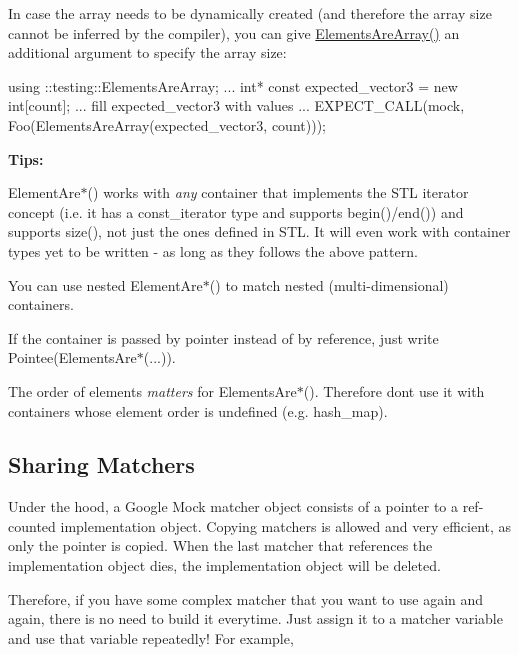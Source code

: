 In case the array needs to be dynamically created (and therefore the array size cannot be inferred by the compiler), you can give {\ttfamily \hyperlink{namespacetesting_ae2eee06e7ddbf5f5372fd24372e9703f}{Elements\+Are\+Array()}} an additional argument to specify the array size\+:


\begin{DoxyCode}
using ::testing::ElementsAreArray;
...
  int* const expected\_vector3 = new int[count];
  ... fill expected\_vector3 with values ...
  EXPECT\_CALL(mock, Foo(ElementsAreArray(expected\_vector3, count)));
\end{DoxyCode}


{\bfseries Tips\+:}


\begin{DoxyItemize}
\item {\ttfamily Element\+Are$\ast$()} works with {\itshape any} container that implements the S\+TL iterator concept (i.\+e. it has a {\ttfamily const\+\_\+iterator} type and supports {\ttfamily begin()/end()}) and supports {\ttfamily size()}, not just the ones defined in S\+TL. It will even work with container types yet to be written -\/ as long as they follows the above pattern.
\item You can use nested {\ttfamily Element\+Are$\ast$()} to match nested (multi-\/dimensional) containers.
\item If the container is passed by pointer instead of by reference, just write {\ttfamily Pointee(Elements\+Are$\ast$(...))}.
\item The order of elements {\itshape matters} for {\ttfamily Elements\+Are$\ast$()}. Therefore don\textquotesingle{}t use it with containers whose element order is undefined (e.\+g. {\ttfamily hash\+\_\+map}).
\end{DoxyItemize}

\subsection*{Sharing Matchers}

Under the hood, a Google Mock matcher object consists of a pointer to a ref-\/counted implementation object. Copying matchers is allowed and very efficient, as only the pointer is copied. When the last matcher that references the implementation object dies, the implementation object will be deleted.

Therefore, if you have some complex matcher that you want to use again and again, there is no need to build it everytime. Just assign it to a matcher variable and use that variable repeatedly! For example,


